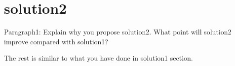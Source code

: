 \section{solution2}
\label{sec:solution2}

Paragraph1: Explain why you propose solution2. What point will solution2 improve compared with solution1?

The rest is similar to what you have done in solution1 section.
